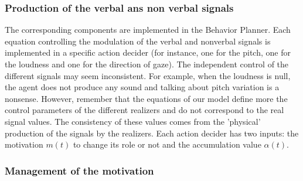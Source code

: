 
\subsubsection{Production of the verbal ans non verbal signals}

The corresponding components are implemented in the Behavior Planner. Each equation controlling the modulation of the verbal and nonverbal signals is implemented in a specific action decider (for instance, one for the pitch, one for the loudness and one for the direction of gaze). 
The independent control of the different signals may seem inconsistent. For example, when the loudness is null, the agent does not produce any sound and talking about pitch variation is a nonsense. However, remember that the equations of our model define more the control parameters of the different realizers and do not correspond to the real signal values. The consistency of these values comes from the 'physical' production of the signals by the realizers.
Each action decider has two inputs: the motivation $m(t)$ to change its role or not and the accumulation value $\alpha(t)$. 

\subsubsection{Management of the motivation}

